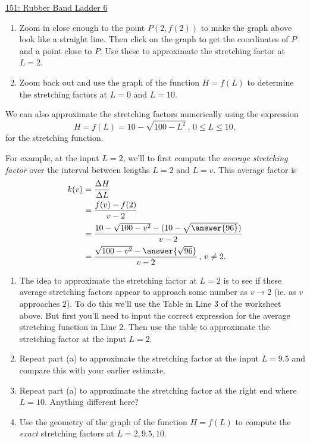 \documentclass{ximera}
\begin{document}
\begin{example}
\href{https://www.desmos.com/calculator/jfwvbbrts1}{151: Rubber Band Ladder 6}

\begin{enumerate}
\item Zoom in close enough to the point $P(2,f(2))$ to make the graph above look like a straight line. Then click on the graph to get the coordinates of $P$ and a point close to $P$. Use these to approximate the stretching factor at $L=2$.


\item Zoom back out and use the graph of the function $H=f(L)$ to determine the stretching factors at $L=0$ and $L=10$.
\end{enumerate}

We can also approximate the stretching factors numerically using the expression
\[
      H = f(L) = 10- \sqrt{100-L^2} \, , \, 0\leq L \leq 10,
\] 
for the stretching function.

For example, at the input $L=2$, we'll to first compute the \emph{average stretching factor} over the interval between lengths $L=2$ and $L=v$. This average factor is 
\begin{align*}
 k(v) &= \frac{\Delta H}{\Delta L} \\
              &= \frac{f(v) - f(2)}{v-2} \\
              &=\frac{10 - \sqrt{100-v^2} - (10 - \sqrt{\answer{96}})}{v-2}   \\
              &= \frac{\sqrt{100-v^2} - \answer{\sqrt{96}}}{v-2} \, , \, v \neq 2.
\end{align*}

\begin{enumerate}
\item The idea to approximate the stretching factor at $L=2$ is to see if these average stretching factors appear to approach some number as $v\to 2$ (ie. as $v$ approaches $2$). To do this we'll use the Table in Line 3 of the worksheet above. But first you'll need to input the correct expression for the average stretching function in Line 2. Then use the table to approximate the stretching factor at the input $L=2$.

\item Repeat part (a) to approximate the stretching factor at the input $L=9.5$ and compare this with your earlier estimate.

\item Repeat part (a) to approximate the stretching factor at the right end where $L=10$. Anything different here?

\item Use the geometry of the graph of the function $H=f(L)$ to compute the \emph{exact} stretching factors at $L=2, 9.5, 10$.
\end{enumerate}
 
\end{example}
\end{document}

